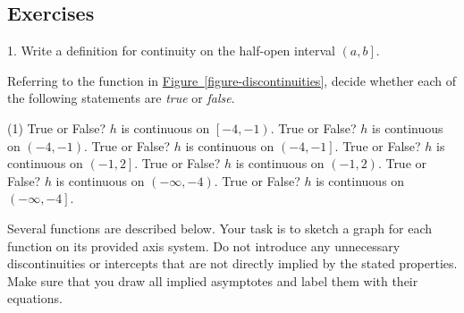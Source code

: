 \documentclass[12pt,]{book}
\theoremstyle{plain}
\theoremstyle{definition}
\theoremstyle{definition}
\theoremstyle{definition}
\theoremstyle{definition}
\theoremstyle{definition}
\numberwithin{equation}{section}
\newcommand{\ointerval}[2]{\left(#1,#2\right)}
\newcommand{\cointerval}[2]{\left[\left.#1,#2\right)\right.}
\newcommand{\ocinterval}[2]{\left(\left.#1,#2\right]\right.}
\begin{document}
\subsection[{Exercises}]{Exercises}\label{exercises-15}
\begin{exerciselist}
\item[1.]\hypertarget{exercise-113}{}Write a definition for continuity on the half-open interval \(\ocinterval{a}{b}\).%
\par\smallskip
\end{exerciselist}
\hypertarget{exercisegroup-26}{}\par\noindent Referring to the function in \hyperref[figure-discontinuities]{Figure~\ref{figure-discontinuities}}, decide whether each of the following statements are \emph{true} or \emph{false}.%
\begin{exercisegroup}(1)
\exercise[2.]\hypertarget{exercise-114}{}True or False? \(h\) is continuous on \(\cointerval{-4}{-1}\).%
\exercise[3.]\hypertarget{exercise-115}{}True or False? \(h\) is continuous on \(\ointerval{-4}{-1}\).%
\exercise[4.]\hypertarget{exercise-116}{}True or False? \(h\) is continuous on \(\ocinterval{-4}{-1}\).%
\exercise[5.]\hypertarget{exercise-117}{}True or False? \(h\) is continuous on \(\ocinterval{-1}{2}\).%
\exercise[6.]\hypertarget{exercise-118}{}True or False? \(h\) is continuous on \(\ointerval{-1}{2}\).%
\exercise[7.]\hypertarget{exercise-119}{}True or False? \(h\) is continuous on \(\ointerval{-\infty}{-4}\).%
\exercise[8.]\hypertarget{exercise-120}{}True or False? \(h\) is continuous on \(\ocinterval{-\infty}{-4}\).%
\end{exercisegroup}
\par\smallskip\noindent
\hypertarget{exercisegroup-27}{}\par\noindent Several functions are described below. Your task is to sketch a graph for each function on its provided axis system. Do not introduce any unnecessary discontinuities or intercepts that are not directly implied by the stated properties. Make sure that you draw all implied asymptotes and label them with their equations.%
\end{document}
